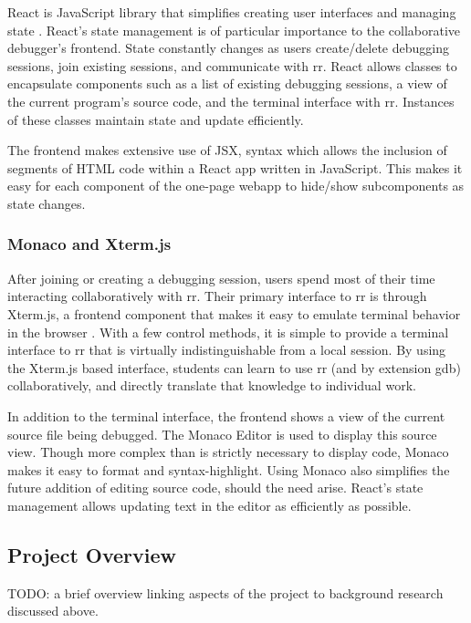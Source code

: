 \documentclass[12pt]{article}
\begin{document}
React is JavaScript library that simplifies creating user interfaces
and managing state \cite{react}.  React's state management is of
particular importance to the collaborative debugger's frontend.  State
constantly changes as users create/delete debugging sessions, join
existing sessions, and communicate with rr.  React allows classes to
encapsulate components such as a list of existing debugging sessions,
a view of the current program's source code, and the terminal
interface with rr.  Instances of these classes maintain state
and update efficiently.
\par
The frontend makes extensive use of JSX, syntax which allows the
inclusion of segments of HTML code within a React app written in
JavaScript.  This makes it easy for each component of the one-page
webapp to hide/show subcomponents as state changes.

\subsubsection{Monaco and Xterm.js}\label{xtermjs/monaco}

After joining or creating a debugging session, users spend most of
their time interacting collaboratively with rr.  Their primary
interface to rr is through Xterm.js, a frontend component that makes
it easy to emulate terminal behavior in the browser \cite{xtermjs}.
With a few control methods, it is simple to provide a terminal
interface to rr that is virtually indistinguishable from a local
session.  By using the Xterm.js based interface, students can learn to
use rr (and by extension gdb) collaboratively, and directly translate
that knowledge to individual work.
\par

In addition to the terminal interface, the frontend shows a view of
the current source file being debugged.  The Monaco Editor
\cite{monaco} is used to display this source view.  Though more
complex than is strictly necessary to display code, Monaco makes it
easy to format and syntax-highlight.  Using Monaco also simplifies the
future addition of editing source code, should the need arise.
React's state management allows updating text in the editor as
efficiently as possible.

\subsection{Project Overview}

TODO: a brief overview linking aspects of the project to background
research discussed above.
\end{document}

